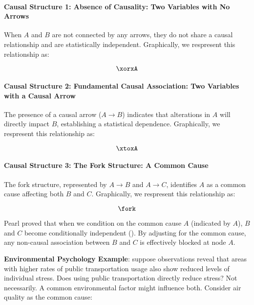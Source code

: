 \documentclass[
  singlecolumn]{article}
\let\oldparagraph\paragraph
\renewcommand{\paragraph}[1]{\oldparagraph{#1}\mbox{}}
\begin{document}
\paragraph{Causal Structure 1: Absence of Causality: Two Variables with
No
Arrows}\label{causal-structure-1-absence-of-causality-two-variables-with-no-arrows}

When \(A\) and \(B\) are not connected by any arrows, they do not share
a causal relationship and are statistically independent. Graphically, we
respresent this relationship as:

\[\xorxA\]

\paragraph{Causal Structure 2: Fundamental Causal Association: Two
Variables with a Causal
Arrow}\label{causal-structure-2-fundamental-causal-association-two-variables-with-a-causal-arrow}

The presence of a causal arrow (\(A \to B\)) indicates that alterations
in \(A\) will directly impact \(B\), establishing a statistical
dependence. Graphically, we respresent this relationship as:

\[\xtoxA\]

\paragraph{Causal Structure 3: The Fork Structure: A Common
Cause}\label{causal-structure-3-the-fork-structure-a-common-cause}

The fork structure, represented by \(A \rightarrow B\) and
\(A \rightarrow C\), identifies \(A\) as a common cause affecting both
\(B\) and \(C\). Graphically, we respresent this relationship as:

\[\fork\]

Pearl proved that when we condition on the common cause \(A\) (indicated
by \(\boxed{A}\)), \(B\) and \(C\) become conditionally independent
(). By adjusting for the common
cause, any non-causal association between \(B\) and \(C\) is effectively
blocked at node \(A\).

\textbf{Environmental Psychology Example}: suppose observations reveal
that areas with higher rates of public transportation usage also show
reduced levels of individual stress. Does using public transportation
directly reduce stress? Not necessarily. A common environmental factor
might influence both. Consider air quality as the common cause:
\end{document}
